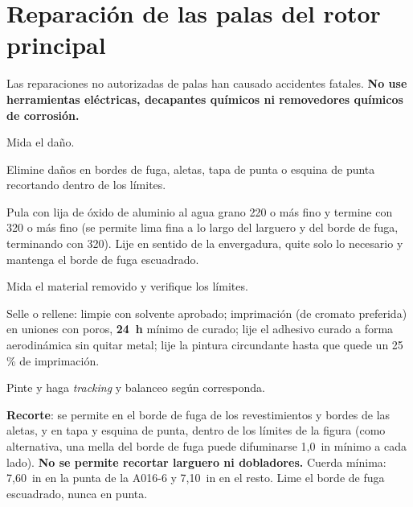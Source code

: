 
\section{Reparación de las palas del rotor principal}

\begin{advertencia}
Las reparaciones no autorizadas de palas han causado accidentes fatales. \textbf{No use herramientas eléctricas, decapantes químicos ni removedores químicos de corrosión.}
\end{advertencia}

\begin{pasos}
\item Mida el daño.
\item Elimine daños en bordes de fuga, aletas, tapa de punta o esquina de punta recortando dentro de los límites.
\item Pula con lija de óxido de aluminio al agua grano 220 o más fino y termine con 320 o más fino (se permite lima fina a lo largo del larguero y del borde de fuga, terminando con 320). Lije en sentido de la envergadura, quite solo lo necesario y mantenga el borde de fuga escuadrado.
\item Mida el material removido y verifique los límites.
\item Selle o rellene: limpie con solvente aprobado; imprimación (de cromato preferida) en uniones con poros, \textbf{24~h} mínimo de curado; lije el adhesivo curado a forma aerodinámica sin quitar metal; lije la pintura circundante hasta que quede un 25\,\% de imprimación.
\item Pinte y haga \emph{tracking} y balanceo según corresponda.
\end{pasos}

\textbf{Recorte}: se permite en el borde de fuga de los revestimientos y bordes de las aletas, y en tapa y esquina de punta, dentro de los límites de la figura (como alternativa, una mella del borde de fuga puede difuminarse 1,0~in mínimo a cada lado). \textbf{No se permite recortar larguero ni dobladores.} Cuerda mínima: 7,60~in en la punta de la A016-6 y 7,10~in en el resto. Lime el borde de fuga escuadrado, nunca en punta.


